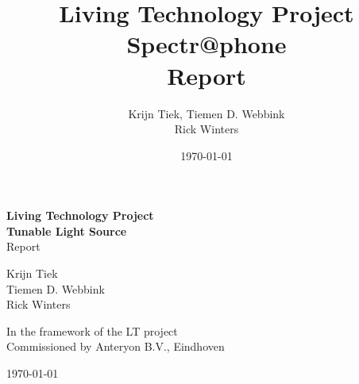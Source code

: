 \documentclass[1pt, a4paper]{book}
\title{Living Technology Project \\ Spectr@phone \\ Report}
\author{Krijn Tiek, Tiemen D. Webbink \\ Rick Winters}
\date{\today}
\begin{document}

\begin{titlepage}
    \begin{center}
        \vspace*{1cm}
        
        \begin{Huge}
        \textbf{Living Technology Project \\ Tunable Light Source}\\
        Report\\

        \end{Huge}
        
        \vspace{4cm}
        
        
        \vfill
        
        \begin{small}
        Krijn Tiek\\
        Tiemen D. Webbink\\
        Rick Winters\\
        \end{small}
        
        \vspace{1cm}
        
        \begin{large}
        In the framework of the LT project \\
        Commissioned by Anteryon B.V., Eindhoven
        \end{large}
        
        \vspace{0.5cm}
        \today  

    \end{center}
\end{titlepage}

\newpage
%

\tableofcontents

\newpage
\listoffigures

%

\newpage
 


\newpage
\begin{appendices}

\end{appendices}
\end{document}
